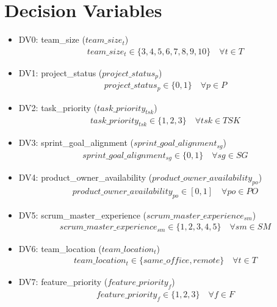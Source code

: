 \documentclass{article}
\begin{document}
\section{Decision Variables}
\begin{itemize}
    \item DV0: team\_size ($team\_size_{t}$)
        \begin{align*}
            team\_size_{t} \in \{3, 4, 5, 6, 7, 8, 9, 10\} \quad \forall t \in T
        \end{align*}
    \item DV1: project\_status ($project\_status_{p}$)
        \begin{align*}
            project\_status_{p} \in \{0, 1\} \quad \forall p \in P
        \end{align*}
    \item DV2: task\_priority ($task\_priority_{tsk}$)
        \begin{align*}
            task\_priority_{tsk} \in \{1, 2, 3\} \quad \forall tsk \in TSK
        \end{align*}
    \item DV3: sprint\_goal\_alignment ($sprint\_goal\_alignment_{sg}$)
        \begin{align*}
            sprint\_goal\_alignment_{sg} \in \{0, 1\} \quad \forall sg \in SG
        \end{align*}
    \item DV4: product\_owner\_availability ($product\_owner\_availability_{po}$)
        \begin{align*}
            product\_owner\_availability_{po} \in [0, 1] \quad \forall po \in PO
        \end{align*}
    \item DV5: scrum\_master\_experience ($scrum\_master\_experience_{sm}$)
        \begin{align*}
            scrum\_master\_experience_{sm} \in \{1, 2, 3, 4, 5\} \quad \forall sm \in SM
        \end{align*}
    \item DV6: team\_location ($team\_location_{t}$)
        \begin{align*}
            team\_location_{t} \in \{same\_office, remote\} \quad \forall t \in T
        \end{align*}
    \item DV7: feature\_priority ($feature\_priority_{f}$)
        \begin{align*}
            feature\_priority_{f} \in \{1, 2, 3\} \quad \forall f \in F

\end{align*}
\end{itemize}
\end{document}
